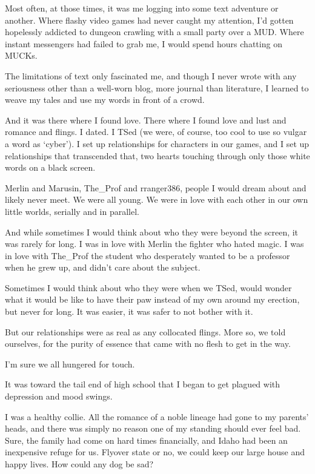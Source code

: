 Most often, at those times, it was me logging into some text adventure or another. Where flashy video games had never caught my attention, I'd gotten hopelessly addicted to dungeon crawling with a small party over a MUD. Where instant messengers had failed to grab me, I would spend hours chatting on MUCKs.

The limitations of text only fascinated me, and though I never wrote with any seriousness other than a well-worn blog, more journal than literature, I learned to weave my tales and use my words in front of a crowd.

And it was there where I found love. There where I found love and lust and romance and flings. I dated. I TSed (we were, of course, too cool to use so vulgar a word as `cyber'). I set up relationships for characters in our games, and I set up relationships that transcended that, two hearts touching through only those white words on a black screen.

Merlin and Marusin, The\_Prof and rranger386, people I would dream about and likely never meet. We were all young. We were in love with each other in our own little worlds, serially and in parallel.

And while sometimes I would think about who they were beyond the screen, it was rarely for long. I was in love with Merlin the fighter who hated magic. I was in love with The\_Prof the student who desperately wanted to be a professor when he grew up, and didn't care about the subject.

Sometimes I would think about who they were when we TSed, would wonder what it would be like to have their paw instead of my own around my erection, but never for long. It was easier, it was safer to not bother with it.

But our relationships were as real as any collocated flings. More so, we told ourselves, for the purity of essence that came with no flesh to get in the way.

I'm sure we all hungered for touch.

It was toward the tail end of high school that I began to get plagued with depression and mood swings.

I was a healthy collie. All the romance of a noble lineage had gone to my parents' heads, and there was simply no reason one of my standing should ever feel bad. Sure, the family had come on hard times financially, and Idaho had been an inexpensive refuge for us. Flyover state or no, we could keep our large house and happy lives. How could any dog be sad?

